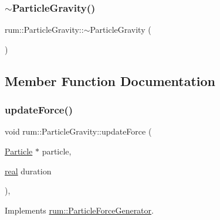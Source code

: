 \mbox{\label{classrum_1_1_particle_gravity_a4c09cee665172d402c6c545a3f9119ce}} 
\subsubsection{\texorpdfstring{$\sim$\+Particle\+Gravity()}{~ParticleGravity()}}
{\footnotesize\ttfamily rum\+::\+Particle\+Gravity\+::$\sim$\+Particle\+Gravity (\begin{DoxyParamCaption}{ }\end{DoxyParamCaption})\hspace{0.3cm}{\ttfamily [default]}}



\subsection{Member Function Documentation}
\mbox{\label{classrum_1_1_particle_gravity_a52871a283cfef5377ef493bed81954a7}} 
\subsubsection{\texorpdfstring{update\+Force()}{updateForce()}}
{\footnotesize\ttfamily void rum\+::\+Particle\+Gravity\+::update\+Force (\begin{DoxyParamCaption}\item[{\mbox{\hyperlink{classrum_1_1_particle}{Particle}} $\ast$}]{particle,  }\item[{\mbox{\hyperlink{namespacerum_a7e8cca23573d5eaead0f138cbaa4862c}{real}}}]{duration }\end{DoxyParamCaption})\hspace{0.3cm}{\ttfamily [override]}, {\ttfamily [virtual]}}



Implements \mbox{\hyperlink{classrum_1_1_particle_force_generator_af7abcafb9527220988ec4b9dde817b34}{rum\+::\+Particle\+Force\+Generator}}.



